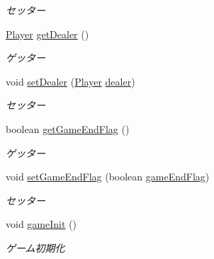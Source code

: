 \begin{DoxyCompactItemize}
\begin{DoxyCompactList}\small\item\em セッター \end{DoxyCompactList}\item 
\hyperlink{classjp_1_1gr_1_1java__conf_1_1yuta__yoshinaga_1_1java__trumpcards_1_1_player}{Player} \hyperlink{classjp_1_1gr_1_1java__conf_1_1yuta__yoshinaga_1_1java__trumpcards_1_1_black_jack_ae3829512336f2ca3f931924b435c8593}{get\+Dealer} ()
\begin{DoxyCompactList}\small\item\em ゲッター \end{DoxyCompactList}\item 
void \hyperlink{classjp_1_1gr_1_1java__conf_1_1yuta__yoshinaga_1_1java__trumpcards_1_1_black_jack_a8fd066f80b7dd83f393a770bb24cd675}{set\+Dealer} (\hyperlink{classjp_1_1gr_1_1java__conf_1_1yuta__yoshinaga_1_1java__trumpcards_1_1_player}{Player} \hyperlink{classjp_1_1gr_1_1java__conf_1_1yuta__yoshinaga_1_1java__trumpcards_1_1_black_jack_a01acee20012cd234246a1b058cc9d8c0}{dealer})
\begin{DoxyCompactList}\small\item\em セッター \end{DoxyCompactList}\item 
boolean \hyperlink{classjp_1_1gr_1_1java__conf_1_1yuta__yoshinaga_1_1java__trumpcards_1_1_black_jack_aa541fa5982861610f084bede8c5d6ac1}{get\+Game\+End\+Flag} ()
\begin{DoxyCompactList}\small\item\em ゲッター \end{DoxyCompactList}\item 
void \hyperlink{classjp_1_1gr_1_1java__conf_1_1yuta__yoshinaga_1_1java__trumpcards_1_1_black_jack_a75ef56d0490e7b343fc6c02acbe43dd7}{set\+Game\+End\+Flag} (boolean \hyperlink{classjp_1_1gr_1_1java__conf_1_1yuta__yoshinaga_1_1java__trumpcards_1_1_black_jack_a91aefa2a1168d70726ddb68735bfe9fe}{game\+End\+Flag})
\begin{DoxyCompactList}\small\item\em セッター \end{DoxyCompactList}\item 
void \hyperlink{classjp_1_1gr_1_1java__conf_1_1yuta__yoshinaga_1_1java__trumpcards_1_1_black_jack_aecf1c840d9643b4809cd5e93710256a4}{game\+Init} ()
\begin{DoxyCompactList}\small\item\em ゲーム初期化 \end{DoxyCompactList}\item 

\end{DoxyCompactItemize}
